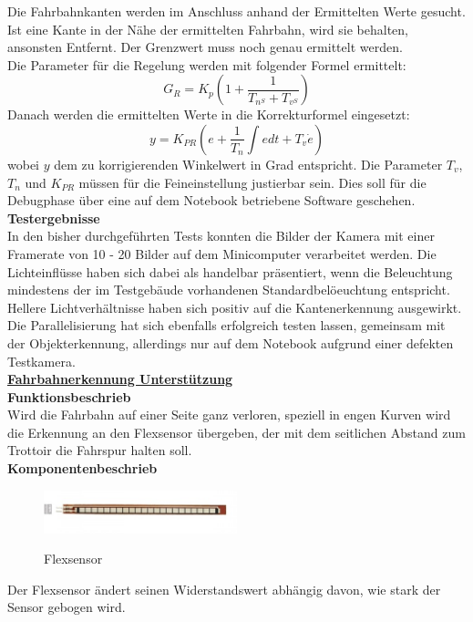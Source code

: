 Die Fahrbahnkanten werden im Anschluss anhand der Ermittelten Werte gesucht. Ist eine Kante in der Nähe der ermittelten Fahrbahn, wird sie behalten, ansonsten Entfernt. Der Grenzwert muss noch genau ermittelt werden.\\
Die Parameter für die Regelung werden mit folgender Formel ermittelt:
\[
G_R = K_p\left(1 + \frac{1}{T_{n^S} + T_{v^S}}\right)
\]
Danach werden die ermittelten Werte in die Korrekturformel eingesetzt:
\[
y = K_{PR}\left(e + \frac{1}{T_n}\int{edt} + T_v\dot{e}\right)
\]
wobei $y$ dem zu korrigierenden Winkelwert in Grad entspricht. Die Parameter $T_v$, $T_n$ und $K_{PR}$ müssen für die Feineinstellung justierbar sein. Dies soll für die Debugphase über eine auf dem Notebook betriebene Software geschehen.
\\[0.2cm]
\textbf{Testergebnisse}\\[0.2cm]
In den bisher durchgeführten Tests konnten die Bilder der Kamera mit einer Framerate von 10 - 20 Bilder auf dem Minicomputer verarbeitet werden. Die Lichteinflüsse haben sich dabei als handelbar präsentiert, wenn die Beleuchtung mindestens der im Testgebäude vorhandenen Standardbelöeuchtung entspricht. Hellere Lichtverhältnisse haben sich positiv auf die Kantenerkennung ausgewirkt.\\
Die Parallelisierung hat sich ebenfalls erfolgreich testen lassen, gemeinsam mit der Objekterkennung, allerdings nur auf dem Notebook aufgrund einer defekten Testkamera.
\\[0.2cm]
\underline{\textbf{Fahrbahnerkennung Unterstützung}}
\\[0.2cm]
\textbf{Funktionsbeschrieb}\\[0.2cm]
Wird die Fahrbahn auf einer Seite ganz verloren, speziell in engen Kurven wird die Erkennung an den Flexsensor übergeben, der mit dem seitlichen Abstand zum Trottoir die Fahrspur halten soll.\\[0.2cm]
\textbf{Komponentenbeschrieb}\\[0.2cm]
\begin{figure}[H]
	\centering
	\includegraphics[width=0.5\textwidth]{03_Loesungskonzept/pictures/Flexsensor.jpg}
	\label{fig:Flexsensor}
	\caption{Flexsensor}
\end{figure}\flushleft%
Der Flexsensor ändert seinen Widerstandswert abhängig davon, wie stark der Sensor gebogen wird. \\[0.2cm]
